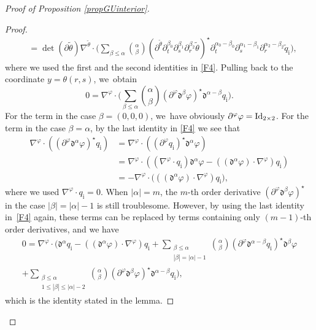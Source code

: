 \documentclass[10pt]{amsart}
\newcommand{\dt}{\partial_t}
\theoremstyle{definition}
\begin{document}
\begin{proof}[Proof of Proposition \ref{propGUinterior}]
\begin{proof}
\begin{align*}
&= \det(\partial\tilde{\theta})\nabla^{\tilde{\theta}}\cdot\biggl(\sum_{\beta\leq\alpha} \binom{\alpha}{\beta}
(\partial^{\tilde{\theta}}\dt^{\beta_0}\partial_s^{\beta_1}\partial_r^{\beta_2}\tilde{\theta})^\star
\dt^{\alpha_0-\beta_0}\partial_s^{\alpha_1-\beta_1}\partial_r^{\alpha_2-\beta_2}\tilde{q}_\mathrm{i} \biggr),
\end{align*}
where we used the first and the second identities in \eqref{F4}.
Pulling back to the coordinate $y=\theta(r,s)$, we~obtain
\[
0 = \nabla^\varphi\cdot\biggl(\sum_{\beta\leq\alpha} \binom{\alpha}{\beta}
(\partial^\varphi\mathfrak{d}^{\beta}\varphi)^\star \mathfrak{d}^{\alpha-\beta} q_\mathrm{i} \biggr).
\]
For the term in the case $\beta=(0,0,0)$, we~have obviously $\partial^\varphi\varphi={\rm Id}_{2\times2}$.
For the term in the case $\beta=\alpha$, by the last identity in \eqref{F4} we see that
\begin{align*}
\nabla^\varphi\cdot((\partial^\varphi\mathfrak{d}^{\alpha}\varphi)^\star q_\mathrm{i})
&= \nabla^\varphi\cdot ((\partial^\varphi q_\mathrm{i})^\star\mathfrak{d}^{\alpha}\varphi) \\
&= \nabla^\varphi\cdot ((\nabla^\varphi\cdot q_\mathrm{i})\mathfrak{d}^{\alpha}\varphi - ((\mathfrak{d}^{\alpha}\varphi)\cdot\nabla^\varphi)q_\mathrm{i}) \\
&= -\nabla^\varphi\cdot \bigl(((\mathfrak{d}^{\alpha}\varphi)\cdot\nabla^\varphi)q_\mathrm{i} \bigr),
\end{align*}
where we used $\nabla^\varphi\cdot q_\mathrm{i}=0$.
When $|\alpha|=m$, the $m$-th order derivative $(\partial^\varphi\mathfrak{d}^{\beta}\varphi)^\star$ in the case $|\beta|=|\alpha|-1$ is still troublesome.
However, by using the last identity in~\eqref{F4} again, these terms can be replaced by terms containing only $(m-1)$-th order derivatives,
and we have
\begin{multline*}
0 = \nabla^\varphi\cdot\biggl(\mathfrak{d}^{\alpha} q_\mathrm{i} - ((\mathfrak{d}^{\alpha}\varphi)\cdot\nabla^\varphi)q_\mathrm{i}
+ \sum_{\substack{\beta\leq\alpha\\ |\beta|=|\alpha|-1}}\binom{\alpha}{\beta} (\partial^\varphi\mathfrak{d}^{\alpha-\beta} q_\mathrm{i})^\star \mathfrak{d}^{\beta}\varphi \\[-10pt]
+ \sum_{\substack{\beta\leq\alpha\\ 1 \leq |\beta| \leq |\alpha|-2}} \binom{\alpha}{\beta}
(\partial^\varphi\mathfrak{d}^{\beta}\varphi)^\star \mathfrak{d}^{\alpha-\beta} q_\mathrm{i} \biggr),
\end{multline*}
which is the identity stated in the lemma.
\end{proof}


\end{proof}
\end{document}
